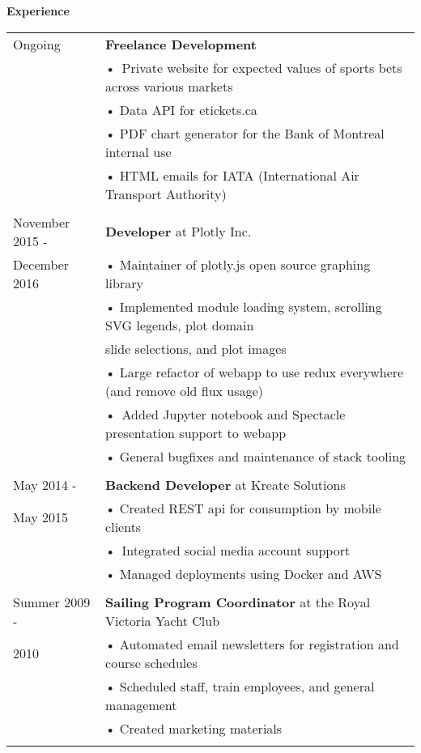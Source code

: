 \documentclass[notitlepage,oneside,draft]{article}
\begin{document}
\begin{flushleft}
  \large
  \textbf{Experience} \\
  \vspace{12pt}
  \normalsize
  \begin{tabular}{ p{86pt} | l}
    Ongoing & \textbf{Freelance Development} \\
    & • Private website for expected values of sports bets across various markets \\
    & • Data API for etickets.ca \\
    & • PDF chart generator for the Bank of Montreal internal use \\
    & • HTML emails for IATA (International Air Transport Authority) \\
    & \\
    November 2015 - & \textbf{Developer} at Plotly Inc. \\
    December 2016 & • Maintainer of plotly.js open source graphing library \\
    & • Implemented module loading system, scrolling SVG legends, plot domain \\
    & \hspace{5pt} slide selections, and plot images \\
    & • Large refactor of webapp to use redux everywhere (and remove old flux usage) \\
    & • Added Jupyter notebook and Spectacle presentation support to webapp \\
    & • General bugfixes and maintenance of stack tooling \\
    & \\
    May 2014 - & \textbf{Backend Developer} at Kreate Solutions \\
    May 2015 & • Created REST api for consumption by mobile clients \\
    & • Integrated social media account support \\
    & • Managed deployments using Docker and AWS \\
    & \\
    Summer 2009 - & \textbf{Sailing Program Coordinator} at the Royal Victoria Yacht Club \\
    2010 & • Automated email newsletters for registration and course schedules \\
    & • Scheduled staff, train employees, and general management \\
    & • Created marketing materials \\
    & \\
  \end{tabular}
  \vspace{24pt}



\end{flushleft}
\end{document}

